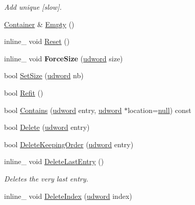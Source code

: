 \begin{DoxyCompactItemize}
\begin{DoxyCompactList}\small\item\em Add unique \mbox{[}slow\mbox{]}. \end{DoxyCompactList}\item 
\hyperlink{classContainer}{Container} \& \hyperlink{classContainer_a4d668ec7d3cbeef642906943e053d7fe}{Empty} ()
\item 
inline\+\_\+ void \hyperlink{classContainer_a6544f7c7bbc942fe6d3dde661d39214b}{Reset} ()
\item 
inline\+\_\+ void {\bfseries Force\+Size} (\hyperlink{IceTypes_8h_a44c6f1920ba5551225fb534f9d1a1733}{udword} size)\hypertarget{classContainer_a6e513df7e95aa3c2345baacbab50978e}{}\label{classContainer_a6e513df7e95aa3c2345baacbab50978e}

\item 
bool \hyperlink{classContainer_a5556de324fa97f6dbed8f8b85cf4f6e3}{Set\+Size} (\hyperlink{IceTypes_8h_a44c6f1920ba5551225fb534f9d1a1733}{udword} nb)
\item 
bool \hyperlink{classContainer_a5a91b8f53d736b761aa75f8f2df3f78a}{Refit} ()
\item 
bool \hyperlink{classContainer_ab81b5847d0ca21c32b3db0d3b460d7ee}{Contains} (\hyperlink{IceTypes_8h_a44c6f1920ba5551225fb534f9d1a1733}{udword} entry, \hyperlink{IceTypes_8h_a44c6f1920ba5551225fb534f9d1a1733}{udword} $\ast$location=\hyperlink{IceTypes_8h_ac97b8ee753e4405397a42ad5799b0f9e}{null}) const 
\item 
bool \hyperlink{classContainer_af26b7fe0482696af03c7b14b94619995}{Delete} (\hyperlink{IceTypes_8h_a44c6f1920ba5551225fb534f9d1a1733}{udword} entry)
\item 
bool \hyperlink{classContainer_a57191aecc817cf1c87d40beeff33c975}{Delete\+Keeping\+Order} (\hyperlink{IceTypes_8h_a44c6f1920ba5551225fb534f9d1a1733}{udword} entry)
\item 
inline\+\_\+ void \hyperlink{classContainer_abfc2182a69a695b274efc258e5816aff}{Delete\+Last\+Entry} ()\hypertarget{classContainer_abfc2182a69a695b274efc258e5816aff}{}\label{classContainer_abfc2182a69a695b274efc258e5816aff}

\begin{DoxyCompactList}\small\item\em Deletes the very last entry. \end{DoxyCompactList}\item 
inline\+\_\+ void \hyperlink{classContainer_a2b617daa7417d0aac0646bbf7cc12c1c}{Delete\+Index} (\hyperlink{IceTypes_8h_a44c6f1920ba5551225fb534f9d1a1733}{udword} index)\hypertarget{classContainer_a2b617daa7417d0aac0646bbf7cc12c1c}{}\label{classContainer_a2b617daa7417d0aac0646bbf7cc12c1c}


\end{DoxyCompactItemize}
